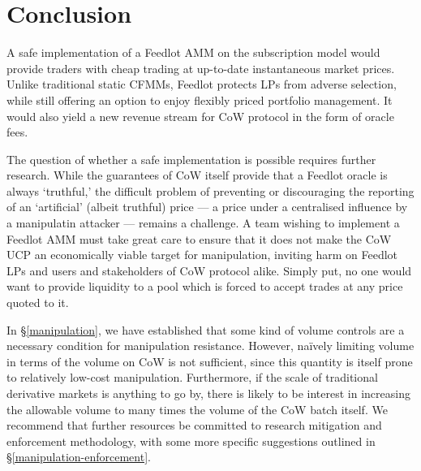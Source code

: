 \documentclass[a4paper,10pt]{article}
\theoremstyle{remark}
\begin{document}
\section{Conclusion}

A safe implementation of a Feedlot AMM on the subscription model would provide traders with cheap trading at up-to-date instantaneous market prices.
%
Unlike traditional static CFMMs, Feedlot protects LPs from adverse selection, while still offering an option to enjoy flexibly priced portfolio management. 
%
It would also yield a new revenue stream for CoW protocol in the form of oracle fees.

The question of whether a safe implementation is possible requires further research.
%
While the guarantees of CoW itself provide that a Feedlot oracle is always `truthful,' the difficult problem of preventing or discouraging the reporting of an `artificial' (albeit truthful) price --- a price under a centralised influence by a manipulatin attacker --- remains a challenge. 
%
A team wishing to implement a Feedlot AMM must take great care to ensure that it does not make the CoW UCP an economically viable target for manipulation, inviting harm on Feedlot LPs and users and stakeholders of CoW protocol alike.
%
Simply put, no one would want to provide liquidity to a pool which is forced to accept trades at any price quoted to it.

In \S\ref{manipulation}, we have established that some kind of volume controls are a necessary condition for manipulation resistance.
%
However, na\"ively limiting volume in terms of the volume on CoW is not sufficient, since this quantity is itself prone to relatively low-cost manipulation.
%
Furthermore, if the scale of traditional derivative markets is anything to go by, there is likely to be interest in increasing the allowable volume to many times the volume of the CoW batch itself.
%
We recommend that further resources be committed to research mitigation and enforcement methodology, with some more specific suggestions outlined in \S\ref{manipulation-enforcement}.


\printbibliography
\end{document}
